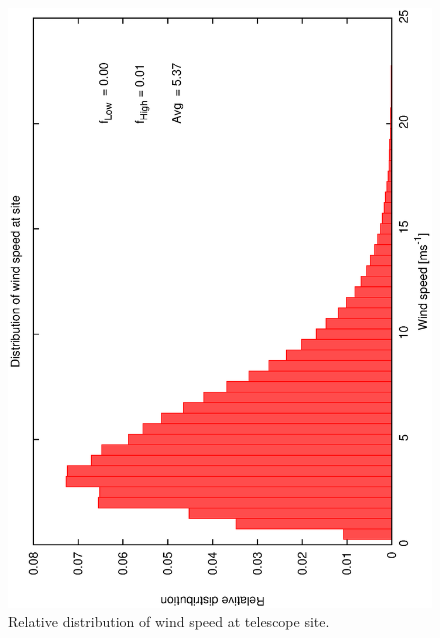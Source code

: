 \clearpage 
\begin{figure}[htbp]
\begin{center}
    \includegraphics[scale=0.4, angle=-90]{figures/ecs/ws_25.dat.eps}
\caption[Relative distribution of wind speed at telescope site.]
{Relative distribution of wind speed at telescope site.}
\end{center} 
  \label{fig:met_windspeed_dist}
\end{figure}

